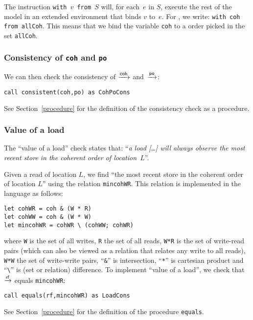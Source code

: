 \documentclass[a4paper]{article}
\begin{document}
The instruction \texttt{with $v$ from $S$} will, for each~$e$ in $S$, execute
the rest of the model in an extended environment that binds $v$ to~$e$. For
\coh{}, we write: \verb+with coh from allCoh+. This means that we bind the
variable {\tt coh} to a \coh{} order picked in the set {\tt allCoh}. 

\subsubsection{Consistency of {\tt coh} and {\tt po}}

We can then  check the consistency of $\xrightarrow{\textsf{\scriptsize{}coh}}$ and~$\xrightarrow{\textsf{\scriptsize{}po}}$:
\begin{verbatim}
call consistent(coh,po) as CohPoCons
\end{verbatim}
See Section~\ref{procedure} for the definition of the consistency check as a
procedure.


\subsubsection{Value of a load}

The ``value of a load'' check states that: ``\emph{a load [\ldots] will always
observe the most recent store in the coherent order of location~$L$}''.

Given a read of location $L$, we find ``the most recent store in the coherent
order of location $L$'' using the relation \texttt{mincohWR}. This relation
is implemented in the \cat{} language as follows:
\begin{verbatim}
let cohWR = coh & (W * R)
let cohWW = coh & (W * W)
let mincohWR = cohWR \ (cohWW; cohWR)
\end{verbatim}
where \verb+W+ is the set of all writes, \verb+R+ the set of all reads,
\verb+W*R+ is the set of write-read pairs (which can also be viewed as a
relation that relates any write to all reads), \verb+W*W+ the set of
write-write pairs, ``\verb+&+'' is intersection, ``\verb+*+'' is cartesian
product and ``\verb+\+'' is (set or relation) difference. To implement ``value
of a load'', we check that $\xrightarrow{\textsf{\scriptsize{}rf}}$ equals \texttt{mincohWR}:

\verb+call equals(rf,mincohWR) as LoadCons+

 
See Section~\ref{procedure} for the definition of the procedure {\tt equals}.
\end{document}
